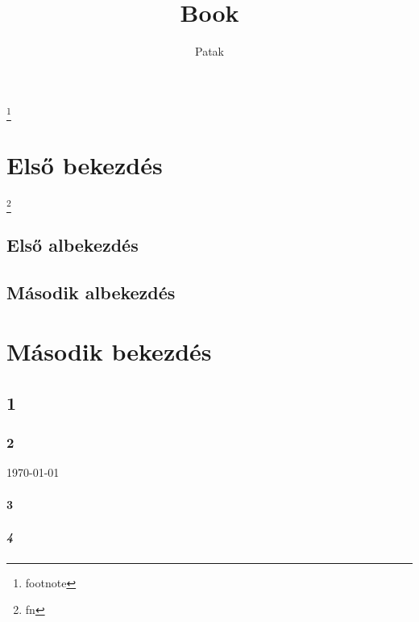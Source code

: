 \documentclass[titlepage,twoside]{article}
\title{Book}
\author{Patak}
\begin{document}
\maketitle
\begin{abstract}
 \hulipsum[2]
\end{abstract}

\footnote{footnote}
\tableofcontents  {} \clearpage
{}
\section[Első bekezdés]{Első bekezdés} \footnote{fn}
 \subsection{Első albekezdés}
 \hulipsum[2]
  \subsection{Második albekezdés}
  \hulipsum[3]
\section{Második bekezdés}

\subsection{1}
\setlength{\parskip}{12pt}
\setlength{\parindent}{0pt}
\hulipsum[3] \medbreak
 \subsubsection{2}
 
\today \smallbreak \raggedleft{\lipsum[3]} \par  \medbreak
 \paragraph{3} 
 \bigskip
 \frenchspacing \linespread{1.6}\selectfont {\blindtext[3]} \par \medbreak
 \subparagraph{4} \medbreak
 
\end{document}
